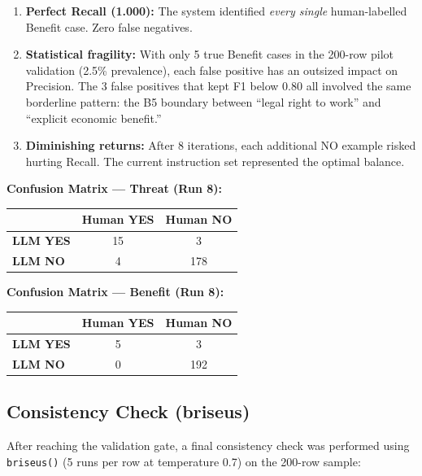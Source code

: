 \begin{enumerate}
    \item \textbf{Perfect Recall (1.000):} The system identified \textit{every single} human-labelled Benefit case. Zero false negatives.
    
    \item \textbf{Statistical fragility:} With only 5 true Benefit cases in the 200-row pilot validation (2.5\% prevalence), each false positive has an outsized impact on Precision. The 3 false positives that kept F1 below 0.80 all involved the same borderline pattern: the B5 boundary between ``legal right to work'' and ``explicit economic benefit.''
    
    \item \textbf{Diminishing returns:} After 8 iterations, each additional NO example risked hurting Recall. The current instruction set represented the optimal balance.
\end{enumerate}

\textbf{Confusion Matrix --- Threat (Run 8):}
\begin{table}[H]
\centering
\begin{tabular}{@{}lcc@{}}
\toprule
 & \textbf{Human YES} & \textbf{Human NO} \\
\midrule
\textbf{LLM YES} & 15 & 3 \\
\textbf{LLM NO}  & 4  & 178 \\
\bottomrule
\end{tabular}
\end{table}

\textbf{Confusion Matrix --- Benefit (Run 8):}
\begin{table}[H]
\centering
\begin{tabular}{@{}lcc@{}}
\toprule
 & \textbf{Human YES} & \textbf{Human NO} \\
\midrule
\textbf{LLM YES} & 5 & 3 \\
\textbf{LLM NO}  & 0 & 192 \\
\bottomrule
\end{tabular}
\end{table}

\subsection{Consistency Check (briseus)}

After reaching the validation gate, a final consistency check was performed using \texttt{briseus()} (5 runs per row at temperature 0.7) on the 200-row sample:

